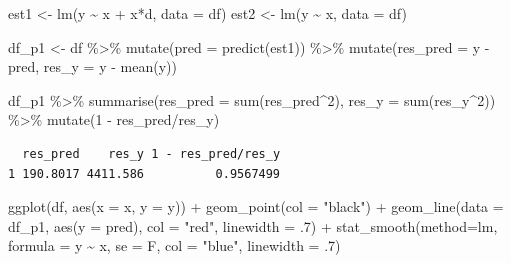 \documentclass[
  letterpaper,
  DIV=11,
  numbers=noendperiod]{scrreprt}
\newenvironment{Shaded}{\begin{snugshade}}{\end{snugshade}}
\newcommand{\AttributeTok}[1]{\textcolor[rgb]{0.40,0.45,0.13}{#1}}
\newcommand{\DecValTok}[1]{\textcolor[rgb]{0.68,0.00,0.00}{#1}}
\newcommand{\FunctionTok}[1]{\textcolor[rgb]{0.28,0.35,0.67}{#1}}
\newcommand{\NormalTok}[1]{\textcolor[rgb]{0.00,0.23,0.31}{#1}}
\newcommand{\OtherTok}[1]{\textcolor[rgb]{0.00,0.23,0.31}{#1}}
\newcommand{\SpecialCharTok}[1]{\textcolor[rgb]{0.37,0.37,0.37}{#1}}
\newcommand{\StringTok}[1]{\textcolor[rgb]{0.13,0.47,0.30}{#1}}
\theoremstyle{definition}
\theoremstyle{remark}
\begin{document}
\begin{Shaded}
\begin{Highlighting}[]
\NormalTok{est1 }\OtherTok{\textless{}{-}} \FunctionTok{lm}\NormalTok{(y }\SpecialCharTok{\textasciitilde{}}\NormalTok{ x }\SpecialCharTok{+}\NormalTok{ x}\SpecialCharTok{*}\NormalTok{d, }\AttributeTok{data =}\NormalTok{ df)}
\NormalTok{est2 }\OtherTok{\textless{}{-}} \FunctionTok{lm}\NormalTok{(y }\SpecialCharTok{\textasciitilde{}}\NormalTok{ x, }\AttributeTok{data =}\NormalTok{ df)}

\NormalTok{df\_p1 }\OtherTok{\textless{}{-}}\NormalTok{ df }\SpecialCharTok{\%\textgreater{}\%} 
  \FunctionTok{mutate}\NormalTok{(}\AttributeTok{pred =} \FunctionTok{predict}\NormalTok{(est1))  }\SpecialCharTok{\%\textgreater{}\%} 
  \FunctionTok{mutate}\NormalTok{(}\AttributeTok{res\_pred =}\NormalTok{ y }\SpecialCharTok{{-}}\NormalTok{ pred, }
         \AttributeTok{res\_y =}\NormalTok{ y }\SpecialCharTok{{-}} \FunctionTok{mean}\NormalTok{(y))}

\NormalTok{df\_p1 }\SpecialCharTok{\%\textgreater{}\%} 
  \FunctionTok{summarise}\NormalTok{(}\AttributeTok{res\_pred =} \FunctionTok{sum}\NormalTok{(res\_pred}\SpecialCharTok{\^{}}\DecValTok{2}\NormalTok{), }
            \AttributeTok{res\_y =} \FunctionTok{sum}\NormalTok{(res\_y}\SpecialCharTok{\^{}}\DecValTok{2}\NormalTok{)) }\SpecialCharTok{\%\textgreater{}\%} 
  \FunctionTok{mutate}\NormalTok{(}\DecValTok{1} \SpecialCharTok{{-}}\NormalTok{ res\_pred}\SpecialCharTok{/}\NormalTok{res\_y)}
\end{Highlighting}
\end{Shaded}

\begin{verbatim}
  res_pred    res_y 1 - res_pred/res_y
1 190.8017 4411.586          0.9567499
\end{verbatim}

\begin{Shaded}
\begin{Highlighting}[]
\FunctionTok{ggplot}\NormalTok{(df, }\FunctionTok{aes}\NormalTok{(}\AttributeTok{x =}\NormalTok{ x, }\AttributeTok{y =}\NormalTok{ y)) }\SpecialCharTok{+}
  \FunctionTok{geom\_point}\NormalTok{(}\AttributeTok{col =} \StringTok{"black"}\NormalTok{) }\SpecialCharTok{+}
  \FunctionTok{geom\_line}\NormalTok{(}\AttributeTok{data =}\NormalTok{ df\_p1, }\FunctionTok{aes}\NormalTok{(}\AttributeTok{y =}\NormalTok{ pred), }\AttributeTok{col =} \StringTok{"red"}\NormalTok{, }\AttributeTok{linewidth =}\NormalTok{ .}\DecValTok{7}\NormalTok{) }\SpecialCharTok{+}
  \FunctionTok{stat\_smooth}\NormalTok{(}\AttributeTok{method=}\StringTok{\textquotesingle{}lm\textquotesingle{}}\NormalTok{, }\AttributeTok{formula =}\NormalTok{ y }\SpecialCharTok{\textasciitilde{}}\NormalTok{ x, }\AttributeTok{se =}\NormalTok{ F, }\AttributeTok{col =} \StringTok{"blue"}\NormalTok{, }\AttributeTok{linewidth =}\NormalTok{ .}\DecValTok{7}\NormalTok{)}
\end{Highlighting}
\end{Shaded}
\end{document}
